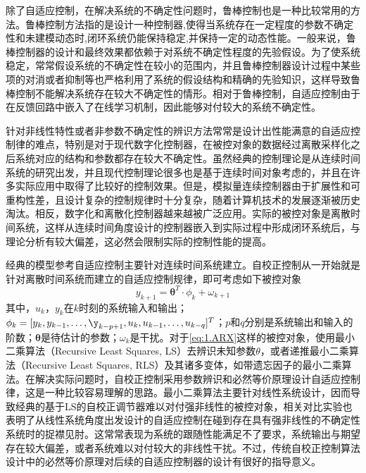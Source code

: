 除了自适应控制，在解决系统的不确定性问题时，鲁棒控制也是一种比较常用的方法。鲁棒控制方法指的是设计一种控制器,使得当系统存在一定程度的参数不确定性和未建模动态时,闭环系统仍能保持稳定,并保持一定的动态性能。一般来说，鲁棒控制器的设计和最终效果都依赖于对系统不确定性程度的先验假设。为了使系统稳定，常常假设系统的不确定性在较小的范围内，并且鲁棒控制器设计过程中某些项的对消或者抑制等也严格利用了系统的假设结构和精确的先验知识，这样导致鲁棒控制不能解决系统存在较大不确定性的情形。相对于鲁棒控制，自适应控制由于在反馈回路中嵌入了在线学习机制，因此能够对付较大的系统不确定性。

针对非线性特性或者非参数不确定性的辨识方法常常是设计出性能满意的自适应控制律的难点，特别是对于现代数字化控制器，在被控对象的数据经过离散采样化之后系统对应的结构和参数都存在较大不确定性。虽然经典的控制理论是从连续时间系统的研究出发，并且现代控制理论很多也是基于连续时间对象考虑的，并且在许多实际应用中取得了比较好的控制效果。但是，模拟量连续控制器由于扩展性和可重构性差，且设计复杂的控制规律时十分复杂，随着计算机技术的发展逐渐被历史淘汰。相反，数字化和离散化控制器越来越被广泛应用。实际的被控对象是离散时间系统，这样从连续时间角度设计的控制器嵌入到实际过程中形成闭环系统后，与理论分析有较大偏差，这必然会限制实际的控制性能的提高。

经典的模型参考自适应控制主要针对连续时间系统建立。自校正控制从一开始就是针对离散时间系统而建立的自适应控制规律，即可考虑如下被控对象
\begin{equation}%
\label{eq:1.ARX}
y_{k+1} = \bm{\theta}^{T}\cdot\phi_{k} + \omega_{k+1}
\end{equation}
其中，$u_{k}$，$y_{k}$在$k$时刻的系统输入和输出；$\phi_{k} = [y_{k},y_{k-1},\ldots,\y_{k-p+1},u_{k},u_{k-1},\ldots,u_{k-q}]^{T}$；$p$和$q$分别是系统输出和输入的阶数；$\bm{\theta}$是待估计的参数；$\omega_{k}$是干扰。对于\eqref{eq:1.ARX}这样的被控对象，使用最小二乘算法（Recursive Least Squares, LS）去辨识未知参数$\theta$，或者递推最小二乘算法（Recursive Least Squares, RLS）及其诸多变体，如带遗忘因子的最小二乘算法。在解决实际问题时，自校正控制采用参数辨识和必然等价原理设计自适应控制律，这是一种比较容易理解的思路。最小二乘算法主要针对线性系统设计，因而导致经典的基于LS的自校正调节器难以对付强非线性的被控对象，相关对比实验也表明了从线性系统角度出发设计的自适应控制在碰到存在具有强非线性的不确定性系统时的捉襟见肘。这常常表现为系统的跟随性能满足不了要求，系统输出与期望存在较大偏差，或者系统难以对付较大的非线性干扰。不过，传统自校正控制算法设计中的必然等价原理对后续的自适应控制器的设计有很好的指导意义。

